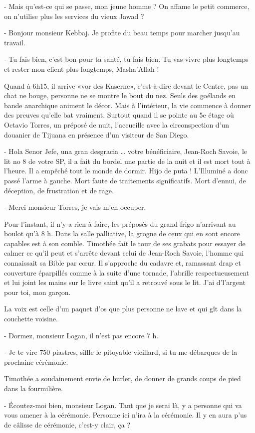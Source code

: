 - Mais qu’est-ce qui se passe, mon jeune homme ? On affame le petit commerce, on n’utilise plus les services du vieux Jawad ?

- Bonjour monsieur Kebbaj. Je profite du beau temps pour marcher jusqu’au travail.

- Tu fais bien, c’est bon pour ta santé, tu fais bien. Tu vas vivre plus longtemps et rester mon client plus longtemps, Masha’Allah !

Quand à 6h15, il arrive «vor des Kaserne», c’est-à-dire devant le Centre, pas un chat ne bouge, personne ne se montre le bout du nez. Seuls des goélands en bande anarchique animent le décor. Mais à l’intérieur, la vie commence à donner des preuves qu’elle bat vraiment. Surtout quand il se pointe au 5e étage où Octavio Torres, un préposé de nuit, l’accueille avec la circonspection d’un douanier de Tijuana en présence d’un visiteur de San Diego.

- Hola Senor Jefe, una gran desgracia … votre bénéficiaire, Jean-Roch Savoie, le lit no 8 de votre SP, il a fait du bordel une partie de la nuit et il est mort tout à l’heure. Il a empêché tout le monde de dormir. Hijo de puta !
L’Illuminé a donc passé l’arme à gauche. Mort faute de traitements significatifs. Mort d’ennui, de déception, de frustration et de rage.

- Merci monsieur Torres, je vais m’en occuper.

Pour l’instant, il n’y a rien à faire, les préposés du grand frigo n’arrivant au boulot qu’à 8 h. Dans la salle palliative, la grogne de ceux qui en sont encore capables est à son comble. Timothée fait le tour de ses grabats pour essayer de calmer ce qu’il peut et s’arrête devant celui de Jean-Roch Savoie, l’homme qui connaissait sa Bible par cœur. Il s’approche du cadavre et, ramassant drap et couverture éparpillés comme à la suite d’une tornade, l’abrille respectueusement et lui joint les mains sur le livre saint qu’il a retrouvé sous le lit. J’ai d’l’argent pour toi, mon garçon.

La voix est celle d’un paquet d’os que plus personne ne lave et qui gît dans la couchette voisine.

- Dormez, monsieur Logan, il n’est pas encore 7 h.

- Je te vire 750 piastres, siffle le pitoyable vieillard, si tu me débarques de la prochaine cérémonie.

Timothée a soudainement envie de hurler, de donner de grands coups de pied dans la fourmilière.

- Écoutez-moi bien, monsieur Logan. Tant que je serai là, y a personne qui va vous amener à la cérémonie. Personne ici n’ira à la cérémonie. Il y en aura p’us de câlisse de cérémonie, c’est-y clair, ça ?

